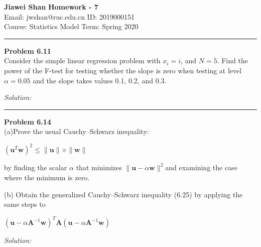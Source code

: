 \documentclass[a4paper, 11pt]{article}
\newenvironment{problem}[2][Problem]
    { \begin{mdframed}[backgroundcolor=gray!20] \textbf{#1 #2} \\}
    {  \end{mdframed}}
\newenvironment{solution}
    {\textit{Solution:}}
    {}
\begin{document}
\noindent
\large\textbf{Jiawei Shan} \hfill \textbf{Homework - 7}   \\
Email: jwshan@ruc.edu.cn \hfill ID: 2019000151 \\
\normalsize Course: Statistics Model \hfill Term: Spring 2020\\
\noindent\rule{7in}{2.8pt}


\begin{problem}{6.11}
  Consider the simple linear regression problem with $ x_i = i$, and $N = 5$. Find the power of the F-test for testing whether the slope is zero when testing at level $\alpha = 0.05$ and the slope takes values 0.1, 0.2, and 0.3.

\end{problem}
\begin{solution}

\end{solution}

\noindent\rule{7in}{2.8pt}

\begin{problem}{6.14}
  (a)Prove the usual Cauchy–Schwarz inequality:
  \begin{center}
      $\left(\mathbf{u}^{T} \mathbf{w}\right)^{2} \leq\|\mathbf{u}\| \times\|\mathbf{w}\|$
  \end{center}
  by finding the scalar $\alpha$ that minimizes $\|\mathbf{u}-\alpha \mathbf{w}\|^2 $and examining the case where the minimum is zero.

  (b)
  Obtain the generalized Cauchy–Schwarz inequality (6.25) by applying
  the same steps to
  \begin{center}
      $\left(\mathbf{u}-\alpha \mathbf{A}^{-1} \mathbf{w}\right)^{T} \mathbf{A}\left(\mathbf{u}-\alpha \mathbf{A}^{-1} \mathbf{w}\right)$
  \end{center}
\end{problem}
\begin{solution}

\end{solution}
\end{document}
